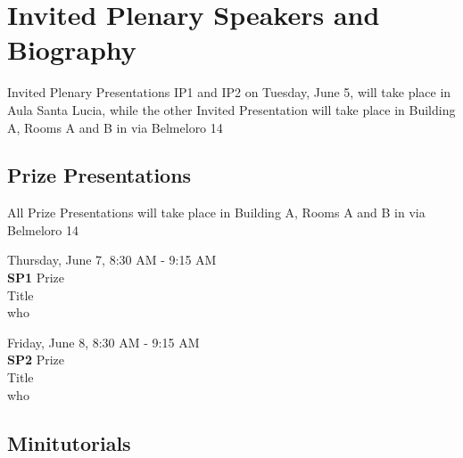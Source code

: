\documentclass[9pt, a4paper]{book}
\begin{document}
\pagestyle{fancy} %






\chapter*{Invited Plenary Speakers and Biography}
{\small{Invited Plenary Presentations  IP1 and IP2 on Tuesday, June 5, will take place in Aula Santa Lucia, while the other Invited Presentation will take place in Building A, Rooms A and B in via Belmeloro 14}}



\newpage
\section*{Prize Presentations}
{\small{All Prize Presentations will take place in Building A, Rooms A and B in via Belmeloro 14}}
\vspace{2cm}
\begin{center}
Thursday, June 7, 8:30 AM - 9:15 AM \\
\textbf{SP1} Prize\\
Title\\
who\\
\end{center}
\vspace{2cm}
\begin{center}
Friday, June 8, 8:30 AM - 9:15 AM \\
\textbf{SP2} Prize\\
Title\\
who\\
\end{center}


\newpage
\section*{Minitutorials}
\end{document}
